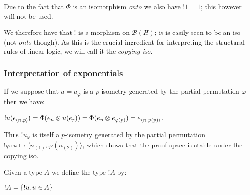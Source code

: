 Due to the fact that \(\Phi\) is an isomorphism \emph{onto} we also have
\(!1=1\); this however will not be used.

We therefore have that \(!\) is a morphism on \(\mathcal{B}(H)\); it is
easily seen to be an iso (not \emph{onto} though). As this is the
crucial ingredient for interpreting the structural rules of linear
logic, we will call it the \emph{copying iso}.

\subsubsection{Interpretation of
exponentials}\label{interpretation-of-exponentials}

If we suppose that \(u = u_\varphi\) is a \(p\)-isometry generated by
the partial permutation \(\varphi\) then we have:

\begin{description}
\tightlist
\item[]
\(!u(e_{\langle n,p\rangle}) = \Phi(e_n\otimes u(e_p)) = \Phi(e_n\otimes e_{\varphi(p)}) = e_{\langle n,\varphi(p)\rangle}\).
\end{description}

Thus \(!u_\varphi\) is itself a \(p\)-isometry generated by the partial
permutation
\(!\varphi:n\mapsto \langle n_{(1)}, \varphi(n_{(2)})\rangle\), which
shows that the proof space is stable under the copying iso.

Given a type \(A\) we define the type \(!A\) by:

\begin{description}
\tightlist
\item[]
\(!A = \{!u, u\in A\}^{\bot\bot}\)
\end{description}

